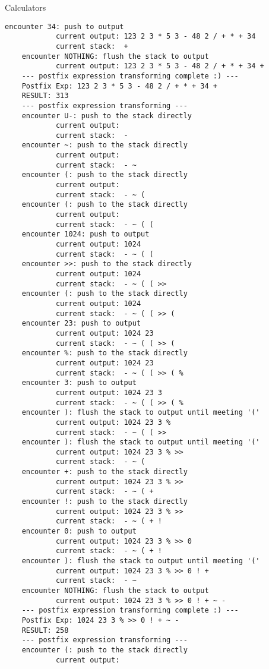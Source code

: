 \begin{homeworkProblem}{Calculators}
\begin{lstlisting}[breaklines=true]
    encounter 34: push to output
            current output: 123 2 3 * 5 3 - 48 2 / + * + 34
            current stack:  +
    encounter NOTHING: flush the stack to output
            current output: 123 2 3 * 5 3 - 48 2 / + * + 34 +
    --- postfix expression transforming complete :) ---
    Postfix Exp: 123 2 3 * 5 3 - 48 2 / + * + 34 +
    RESULT: 313
    --- postfix expression transforming ---
    encounter U-: push to the stack directly
            current output:
            current stack:  -
    encounter ~: push to the stack directly
            current output:
            current stack:  - ~
    encounter (: push to the stack directly
            current output:
            current stack:  - ~ (
    encounter (: push to the stack directly
            current output:
            current stack:  - ~ ( (
    encounter 1024: push to output
            current output: 1024
            current stack:  - ~ ( (
    encounter >>: push to the stack directly
            current output: 1024
            current stack:  - ~ ( ( >>
    encounter (: push to the stack directly
            current output: 1024
            current stack:  - ~ ( ( >> (
    encounter 23: push to output
            current output: 1024 23
            current stack:  - ~ ( ( >> (
    encounter %: push to the stack directly
            current output: 1024 23
            current stack:  - ~ ( ( >> ( %
    encounter 3: push to output
            current output: 1024 23 3
            current stack:  - ~ ( ( >> ( %
    encounter ): flush the stack to output until meeting '('
            current output: 1024 23 3 %
            current stack:  - ~ ( ( >>
    encounter ): flush the stack to output until meeting '('
            current output: 1024 23 3 % >>
            current stack:  - ~ (
    encounter +: push to the stack directly
            current output: 1024 23 3 % >>
            current stack:  - ~ ( +
    encounter !: push to the stack directly
            current output: 1024 23 3 % >>
            current stack:  - ~ ( + !
    encounter 0: push to output
            current output: 1024 23 3 % >> 0
            current stack:  - ~ ( + !
    encounter ): flush the stack to output until meeting '('
            current output: 1024 23 3 % >> 0 ! +
            current stack:  - ~
    encounter NOTHING: flush the stack to output
            current output: 1024 23 3 % >> 0 ! + ~ -
    --- postfix expression transforming complete :) ---
    Postfix Exp: 1024 23 3 % >> 0 ! + ~ -
    RESULT: 258
    --- postfix expression transforming ---
    encounter (: push to the stack directly
            current output:

\end{lstlisting}
\end{homeworkProblem}
